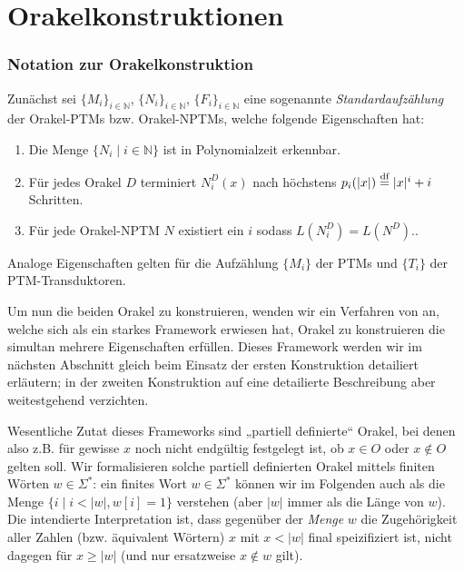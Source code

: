 \chapter{Orakelkonstruktionen}\label{chap:orakel}


\subsection*{Notation zur Orakelkonstruktion}

Zunächst sei $\{M_i\}_{i\in \mathbb N}$, $\{N_i\}_{i\in \mathbb N}$, $\{F_i\}_{i\in\mathbb N}$ eine sogenannte \emph{Standardaufzählung} der Orakel-PTMs bzw. Orakel-NPTMs, welche folgende Eigenschaften hat:
\begin{enumerate}[label=\arabic*.,nosep]
    \item Die Menge $\{N_i \mid i\in\mathbb N\}$ ist in Polynomialzeit erkennbar.
    \item Für jedes Orakel $D$ terminiert $N_i^D(x)$ nach höchstens $p_i(|x|)\stackrel{\text{df}}{=} |x|^i+i$ Schritten.
    \item Für jede Orakel-NPTM $N$ existiert ein $i$ sodass $L(N^D_i)=L(N^D).$.
\end{enumerate}
Analoge Eigenschaften gelten für die Aufzählung $\{M_i\}$ der PTMs und $\{T_i\}$ der PTM-Transduktoren.

Um nun die beiden Orakel zu konstruieren, wenden wir ein Verfahren von \textcite{dose_np-completeness_2019} an, welche sich als ein starkes Framework erwiesen hat, Orakel zu konstruieren die simultan mehrere Eigenschaften erfüllen.
Dieses Framework werden wir im nächsten Abschnitt gleich beim Einsatz der ersten Konstruktion detailiert erläutern; in der zweiten Konstruktion auf eine detailierte Beschreibung aber weitestgehend verzichten.

Wesentliche Zutat dieses Frameworks sind „partiell definierte“ Orakel, bei denen also z.B. für gewisse $x$ noch nicht endgültig festgelegt ist, ob $x\in O$ oder $x\not\in O$ gelten soll.
Wir formalisieren solche partiell definierten Orakel mittels finiten Wörten $w\in\Sigma^*$:
ein finites Wort $w\in\Sigma^*$ können wir im Folgenden auch als die Menge $\{ i \mid i<|w|, w[i] = 1 \}$ verstehen (aber $|w|$ immer als die Länge von $w$).
Die intendierte Interpretation ist, dass gegenüber der \emph{Menge} $w$ die Zugehörigkeit aller Zahlen (bzw. äquivalent Wörtern) $x$ mit $x<|w|$ final speizifiziert ist, nicht dagegen für $x\geq|w|$ (und nur ersatzweise $x\not\in w$ gilt).

